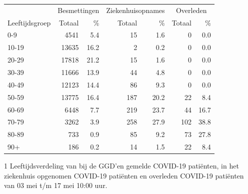 \documentclass[
  english,
  man,floatsintext]{apa6}
\begin{document}
\begin{table}
\centering\begingroup\fontsize{11}{13}\selectfont

\begin{threeparttable}
\begin{tabular}{lrrrrrr}
\toprule
\multicolumn{1}{c}{ } & \multicolumn{2}{c}{Besmettingen} & \multicolumn{2}{c}{Ziekenhuisopnames} & \multicolumn{2}{c}{Overleden} \\
\cmidrule(l{3pt}r{3pt}){2-3} \cmidrule(l{3pt}r{3pt}){4-5} \cmidrule(l{3pt}r{3pt}){6-7}
Leeftijdsgroep & Totaal & \% & Totaal & \% & Totaal & \%\\
\midrule
0-9 & 4541 & 5.4 & 15 & 1.6 & 0 & 0.0\\
10-19 & 13635 & 16.2 & 2 & 0.2 & 0 & 0.0\\
20-29 & 17818 & 21.2 & 15 & 1.6 & 0 & 0.0\\
30-39 & 11666 & 13.9 & 44 & 4.8 & 0 & 0.0\\
40-49 & 12123 & 14.4 & 86 & 9.3 & 0 & 0.0\\
50-59 & 13775 & 16.4 & 187 & 20.2 & 22 & 8.4\\
60-69 & 6448 & 7.7 & 219 & 23.7 & 44 & 16.7\\
70-79 & 3262 & 3.9 & 258 & 27.9 & 102 & 38.8\\
80-89 & 733 & 0.9 & 85 & 9.2 & 73 & 27.8\\
90+ & 186 & 0.2 & 14 & 1.5 & 22 & 8.4\\
\bottomrule
\end{tabular}
\begin{tablenotes}
\item[1] Leeftijdsverdeling van bij de GGD’en gemelde COVID-19 patiënten, in het ziekenhuis opgenomen COVID-19 patiënten en overleden COVID-19 patiënten van 03 mei t/m 17 mei 10:00 uur.
\end{tablenotes}
\end{threeparttable}
\endgroup{}
\end{table}

\newpage
\end{document}
